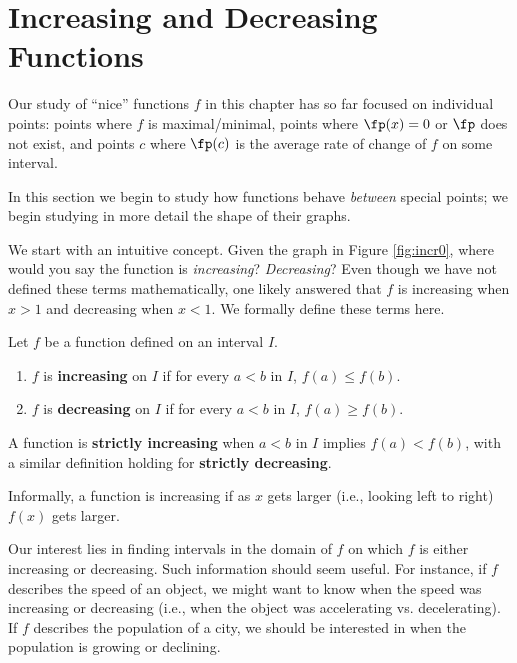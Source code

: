 \section{Increasing and Decreasing Functions}\label{sec:incr_decr}

Our study of ``nice'' functions $f$ in this chapter has so far focused on individual points: points where $f$ is maximal/minimal, points where $\fp(x) = 0$ or $\fp$ does not exist, and points $c$ where $\fp(c)$ is the average rate of change of $f$ on some interval. 

In this section we begin to study how functions behave \textit{between} special points; we begin studying in more detail the shape of their graphs. 

We start with an intuitive concept. Given the graph in Figure \ref{fig:incr0}, %
where would you say the function is \textit{increasing}? \textit{Decreasing}? Even though we have not defined these terms mathematically, one likely answered that $f$ is increasing when $x>1$ and decreasing when $x<1$. We formally define these terms here.


{Let $f$ be a function defined on an interval $I$.
\begin{enumerate}
\item		$f$ is \textbf{increasing} on $I$ if for every $a<b$ in $I$, $f(a) \leq f(b)$.
\item		$f$ is \textbf{decreasing} on $I$ if for every $a<b$ in $I$, $f(a) \geq f(b)$.
\end{enumerate}
A function is \textbf{strictly increasing} when $a<b$ in $I$ implies $f(a) < f(b)$, with a similar definition holding for \textbf{strictly decreasing}.
}

Informally, a function is increasing if as $x$ gets larger (i.e., looking left to right) $f(x)$ gets larger.

Our interest lies in finding intervals in the domain of $f$ on which $f$ is either increasing or decreasing. Such information should seem useful. For instance, if $f$ describes the speed of an object, we might want to know when the speed was increasing or decreasing (i.e., when the object was accelerating vs. decelerating). If $f$ describes the population of a city, we should be interested in when the population is growing or declining.

